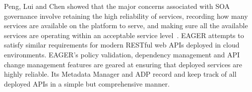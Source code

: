 Peng, Lui and Chen showed that
the major concerns associated with SOA governance involve retaining the high reliability of services, recording how many services
are available on the platform to serve, and making sure all the available services are operating within an acceptable service
level~\cite{4730489}. EAGER attempts to satisfy similar requirements for modern RESTful web APIs deployed in cloud environments. EAGER's policy
validation, dependency management and API change management features are geared at ensuring that deployed services
are highly reliable. Its Metadata Manager and ADP record and keep track of all deployed APIs in a simple but comprehensive manner.

